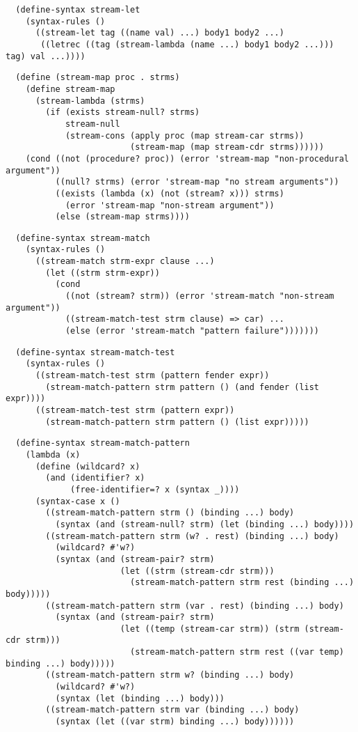 \begin{verbatim}
  (define-syntax stream-let
    (syntax-rules ()
      ((stream-let tag ((name val) ...) body1 body2 ...)
       ((letrec ((tag (stream-lambda (name ...) body1 body2 ...))) tag) val ...))))
\end{verbatim}

\begin{verbatim}
  (define (stream-map proc . strms)
    (define stream-map
      (stream-lambda (strms)
        (if (exists stream-null? strms)
            stream-null
            (stream-cons (apply proc (map stream-car strms))
                         (stream-map (map stream-cdr strms))))))
    (cond ((not (procedure? proc)) (error 'stream-map "non-procedural argument"))
          ((null? strms) (error 'stream-map "no stream arguments"))
          ((exists (lambda (x) (not (stream? x))) strms)
            (error 'stream-map "non-stream argument"))
          (else (stream-map strms))))
\end{verbatim}

\begin{verbatim}
  (define-syntax stream-match
    (syntax-rules ()
      ((stream-match strm-expr clause ...)
        (let ((strm strm-expr))
          (cond
            ((not (stream? strm)) (error 'stream-match "non-stream argument"))
            ((stream-match-test strm clause) => car) ...
            (else (error 'stream-match "pattern failure")))))))
\end{verbatim}

\begin{verbatim}
  (define-syntax stream-match-test
    (syntax-rules ()
      ((stream-match-test strm (pattern fender expr))
        (stream-match-pattern strm pattern () (and fender (list expr))))
      ((stream-match-test strm (pattern expr))
        (stream-match-pattern strm pattern () (list expr)))))
\end{verbatim}

\begin{verbatim}
  (define-syntax stream-match-pattern 
    (lambda (x)
      (define (wildcard? x)
        (and (identifier? x)
             (free-identifier=? x (syntax _))))
      (syntax-case x () 
        ((stream-match-pattern strm () (binding ...) body)
          (syntax (and (stream-null? strm) (let (binding ...) body))))
        ((stream-match-pattern strm (w? . rest) (binding ...) body)
          (wildcard? #'w?) 
          (syntax (and (stream-pair? strm)
                       (let ((strm (stream-cdr strm)))
                         (stream-match-pattern strm rest (binding ...) body)))))
        ((stream-match-pattern strm (var . rest) (binding ...) body)
          (syntax (and (stream-pair? strm)
                       (let ((temp (stream-car strm)) (strm (stream-cdr strm))) 
                         (stream-match-pattern strm rest ((var temp) binding ...) body)))))
        ((stream-match-pattern strm w? (binding ...) body)
          (wildcard? #'w?)
          (syntax (let (binding ...) body)))
        ((stream-match-pattern strm var (binding ...) body) 
          (syntax (let ((var strm) binding ...) body))))))
\end{verbatim}

